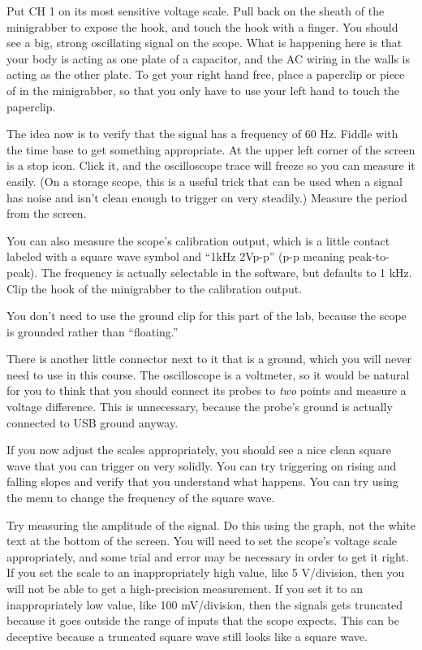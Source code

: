 Put CH 1 on its most sensitive voltage scale. Pull back on the sheath of the minigrabber
to expose the hook, and touch the hook with a finger. You should see a big, strong
oscillating signal on the scope. What is happening here is that your body is acting
as one plate of a capacitor, and the AC wiring in the walls is acting as the other
plate.
To get your right hand free, place a  paperclip or piece of in the minigrabber, so that you
only have to use your left hand to touch the paperclip.

The idea now is to verify that the signal has a frequency of 60 Hz. Fiddle with the time
base to get something appropriate. At the upper left corner of the screen is a stop icon.
Click it, and the oscilloscope trace will freeze so you can measure it easily. (On a storage
scope, this is a useful trick that can be used when a signal has noise and isn't clean enough
to trigger on very steadily.) Measure the period from the screen.


You can also measure the scope's calibration output, which is a little
contact labeled with a square wave symbol and ``1kHz 2Vp-p'' (p-p
meaning peak-to-peak).  The frequency is actually selectable in the
software, but defaults to 1 kHz.  Clip the hook of the minigrabber to
the calibration output.

You don't need to use the ground clip for this part of the lab, because the
scope is grounded rather than ``floating.''

There is another little connector next to it that
is a ground, which you will never need to use in this course.
The oscilloscope is a voltmeter, so it would be
natural for you to think that you should connect its probes to \emph{two} points and measure a voltage
difference. This is unnecessary, because the probe's ground is actually connected to USB ground anyway.

If you now adjust the scales appropriately, you should see a nice clean square wave that you can trigger
on very solidly. You can try triggering on rising and falling slopes and verify that you understand what
happens. You can try using the menu to change the frequency of the square wave.

Try measuring the amplitude of the signal. Do this using the graph, not the white text at the bottom
of the screen. You will need to set the scope's voltage scale appropriately, and some trial and error
may be necessary in order to get it right. If you set the scale to an inappropriately high value,
like 5 V/division, then you will not be able to get a high-precision measurement. If you set it to an
inappropriately low value, like 100 mV/division, then the signals gets truncated because it goes outside
the range of inputs that the scope expects. This can be deceptive because a truncated square wave still
looks like a square wave. 

